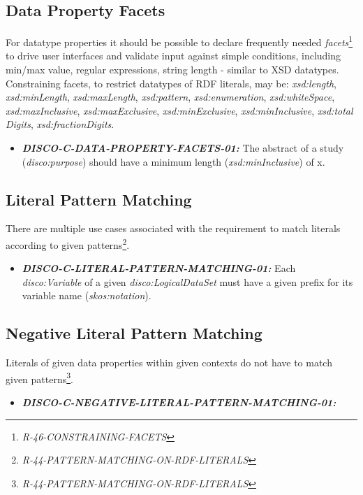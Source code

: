 \documentclass{llncs}
\begin{document}
\subsection{Data Property Facets}

For datatype properties it should be possible to declare frequently needed \emph{facets}\footnote{\emph{R-46-CONSTRAINING-FACETS}} to drive user interfaces and validate input against simple conditions, including min/max value, regular expressions, string length - similar to XSD datatypes. 
Constraining facets, to restrict datatypes of RDF literals, may be: \emph{xsd:length}, \emph{xsd:minLength}, \emph{xsd:maxLength}, \emph{xsd:pattern}, \emph{xsd:enumeration}, \emph{xsd:whiteSpace}, \\ \emph{xsd:maxInclusive}, \emph{xsd:maxExclusive}, \emph{xsd:minExclusive}, \emph{xsd:minInclusive}, \emph{xsd:total} \emph{Digits}, \emph{xsd:fractionDigits}.

\begin{itemize}
	\item \textbf{{\em DISCO-C-DATA-PROPERTY-FACETS-01:}} The abstract of a study (\emph{disco:purpose}) should have a minimum length (\emph{xsd:minInclusive}) of x. 
\end{itemize}

\subsection{Literal Pattern Matching}

There are multiple use cases associated with the requirement to match literals according to given patterns\footnote{\emph{R-44-PATTERN-MATCHING-ON-RDF-LITERALS}}.

\begin{itemize}
	\item \textbf{{\em DISCO-C-LITERAL-PATTERN-MATCHING-01:}} Each \emph{disco:Variable} of a given \emph{disco:LogicalDataSet} must have a given prefix for its variable name (\emph{skos:notation}). 
\end{itemize}

\subsection{Negative Literal Pattern Matching}

Literals of given data properties within given contexts do not have to match given patterns\footnote{\emph{R-44-PATTERN-MATCHING-ON-RDF-LITERALS}}. 

\begin{itemize}
	\item \textbf{{\em DISCO-C-NEGATIVE-LITERAL-PATTERN-MATCHING-01:}} 
\end{itemize}
\end{document}
